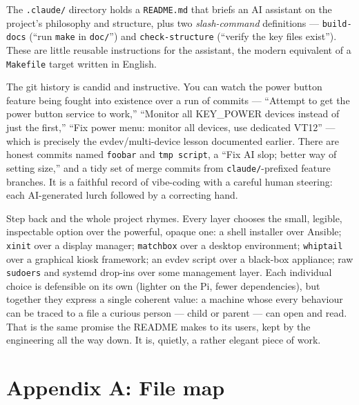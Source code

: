 \documentclass[11pt,oneside]{article}
\newcommand{\file}[1]{\textcolor{kbteal}{\texttt{#1}}}
\begin{document}
The \file{.claude/} directory holds a \file{README.md} that briefs an AI
assistant on the project's philosophy and structure, plus two
\emph{slash-command} definitions --- \file{build-docs} (``run \texttt{make} in
\file{doc/}'') and \file{check-structure} (``verify the key files exist''). These
are little reusable instructions for the assistant, the modern equivalent of a
\texttt{Makefile} target written in English.

The git history is candid and instructive. You can watch the power button
feature being fought into existence over a run of commits --- ``Attempt to get
the power button service to work,'' ``Monitor all KEY\_POWER devices instead of
just the first,'' ``Fix power menu: monitor all devices, use dedicated VT12'' ---
which is precisely the evdev/multi-device lesson documented earlier. There are
honest commits named \texttt{foobar} and \texttt{tmp script}, a ``Fix AI slop;
better way of setting size,'' and a tidy set of merge commits from
\texttt{claude/}-prefixed feature branches. It is a faithful record of
vibe-coding with a careful human steering: each AI-generated lurch followed by a
correcting hand.

\begin{deeper}
Step back and the whole project rhymes. Every layer chooses the small, legible,
inspectable option over the powerful, opaque one: a shell installer over Ansible;
\texttt{xinit} over a display manager; \texttt{matchbox} over a desktop
environment; \texttt{whiptail} over a graphical kiosk framework; an evdev script
over a black-box appliance; raw \texttt{sudoers} and systemd drop-ins over some
management layer. Each individual choice is defensible on its own (lighter on the
Pi, fewer dependencies), but together they express a single coherent value: a
machine whose every behaviour can be traced to a file a curious person --- child
or parent --- can open and read. That is the same promise the README makes to its
users, kept by the engineering all the way down. It is, quietly, a rather elegant
piece of work.
\end{deeper}

\section*{Appendix A: File map}
\end{document}
